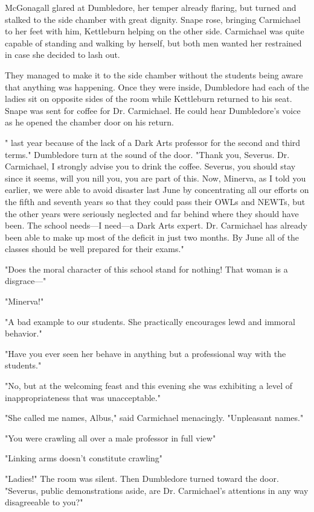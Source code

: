 McGonagall glared at Dumbledore, her temper already flaring, but turned and stalked to the side chamber with great dignity. Snape rose, bringing Carmichael to her feet with him, Kettleburn helping on the other side. Carmichael was quite capable of standing and walking by herself, but both men wanted her restrained in case she decided to lash out.

They managed to make it to the side chamber without the students being aware that anything was happening. Once they were inside, Dumbledore had each of the ladies sit on opposite sides of the room while Kettleburn returned to his seat. Snape was sent for coffee for Dr. Carmichael. He could hear Dumbledore's voice as he opened the chamber door on his return.

"{\el} last year because of the lack of a Dark Arts professor for the second and third terms." Dumbledore turn at the sound of the door. "Thank you, Severus. Dr. Carmichael, I strongly advise you to drink the coffee. Severus, you should stay since it seems, will you nill you, you are part of this. Now, Minerva, as I told you earlier, we were able to avoid disaster last June by concentrating all our efforts on the fifth and seventh years so that they could pass their OWLs and NEWTs, but the other years were seriously neglected and far behind where they should have been. The school needs—I need—a Dark Arts expert. Dr. Carmichael has already been able to make up most of the deficit in just two months. By June all of the classes should be well prepared for their exams."

"Does the moral character of this school stand for nothing! That woman is a disgrace—"

"Minerva!"

"A bad example to our students. She practically encourages lewd and immoral behavior."

"Have you ever seen her behave in anything but a professional way with the students."

"No, but at the welcoming feast and this evening she was exhibiting a level of inappropriateness that was unacceptable."

"She called me names, Albus," said Carmichael menacingly. "Unpleasant names."

"You were crawling all over a male professor in full view{\el}"

"Linking arms doesn't constitute crawling{\el}"

"Ladies!" The room was silent. Then Dumbledore turned toward the door. "Severus, public demonstrations aside, are Dr. Carmichael's attentions in any way disagreeable to you?"

